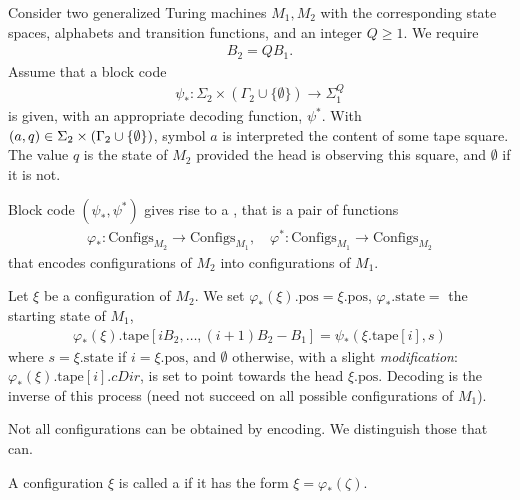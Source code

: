 \documentclass[12pt]{memoir}
\newcommand{\fld}[1]{\ensuremath{\textit{#1}}}
\def\B{B}
\newcommand{\Configs}{\mathrm{Configs}}
\newcommand{\pos}{\mathrm{pos}}
\newcommand{\cDir}{\fld{cDir}}
\newcommand{\state}{\mathrm{state}}
\newcommand{\tape}{\mathrm{tape}}
\begin{document}
\begin{definition}\label{def:configuration-code}
Consider two generalized Turing machines \( M_{1},M_{2} \) with the corresponding
state spaces, alphabets and transition functions, and an integer \( Q\ge 1 \).
We require
\begin{align}\label{eq:B_2-B_1-Q}
  \B_{2} = Q \B_{1}.
\end{align}
Assume that a block code
\begin{align*}
   \psi_{*}:\Sigma_{2}\times(\Gamma_{2}\cup\{\emptyset\})\to\Sigma_{1}^{Q}
 \end{align*}
is given, with an appropriate decoding function, \( \psi^{*} \).
With \( (a,q)\in\Sigma_{2}\times(\Gamma_{2}\cup\{\emptyset\}) \),
symbol \( a \) is interpreted the content of some tape square.
The value \( q \) is the state of \( M_{2} \) provided the head is observing this square,
and \( \emptyset \) if it is not.

Block code \( (\psi_{*},\psi^{*}) \) gives rise to a 
, that is a pair of functions
    \begin{align*}
        \varphi_{*} :\Configs_{M_2} \to \Configs_{M_1},
        \quad
        \varphi^{*}:\Configs_{M_1} \to \Configs_{M_2}
    \end{align*}
    that encodes configurations of \( M_2 \) into configurations of \( M_{1} \).

Let \( \xi \) be a configuration of \( M_2 \).
We set \( \varphi_*(\xi).\pos = \xi.\pos \), \(\varphi_{*}.\state=  \) 
the starting state of \( M_{1} \),
\begin{align*}
 \varphi_*(\xi).\tape[i\B_2, \dots, (i+1)\B_2 - \B_1] = \psi_*(\xi.\tape[i], s)
 \end{align*}
where \( s=\xi.\state \) if \( i = \xi.\pos \), and \( \emptyset \) otherwise, with
a slight \emph{modification}: 
\( \varphi_*(\xi).\tape[i].\cDir \), is set to point towards the head \( \xi.\pos \).
Decoding is the inverse of this process (need not succeed on all possible configurations
of \( M_{1} \)).
 \end{definition}

 Not all configurations can be obtained by encoding.
 We distinguish those that can.

 \begin{definition}\label{def:code-config}
   A configuration \( \xi \) is called a  if 
it has the form \( \xi=\varphi_{*}(\zeta) \).
 \end{definition}
\end{document}

